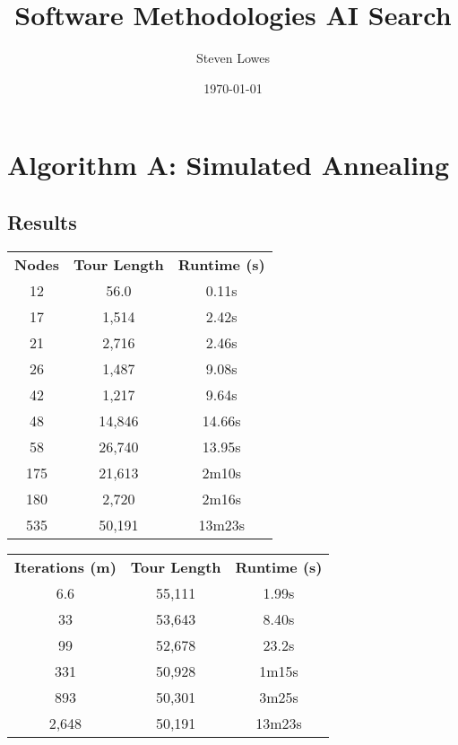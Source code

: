 \documentclass[a4paper, 11pt,table]{article}
\author{Steven Lowes}
\title{Software Methodologies AI Search}
\date{\today{}}
\begin{document}
	\section{Algorithm A: Simulated Annealing}
	
	\subsection{Results}
	\label{useCase:annealResults}
	\begin{center}
		\begin{tabu}{|c c c|}
			\textbf{Nodes} & \textbf{Tour Length} & \textbf{Runtime (s)}\\
			12 & 56.0 & 0.11s \\
			17 & 1,514 & 2.42s\\
			21 & 2,716 & 2.46s\\
			26 & 1,487 & 9.08s\\
			42 & 1,217 & 9.64s\\
			48 & 14,846 & 14.66s\\
			58 & 26,740 & 13.95s\\
			175 & 21,613 & 2m10s\\
			180 & 2,720 & 2m16s\\
			535 & 50,191 & 13m23s\\
		\end{tabu}
	\end{center}

	\begin{center}
		\begin{tabu}{|c c c|}
			\textbf{Iterations (m)} & \textbf{Tour Length} & \textbf{Runtime (s)}\\
			6.6 & 55,111 & 1.99s\\
			33 & 53,643 & 8.40s\\
			99 & 52,678 & 23.2s\\
			331 & 50,928 & 1m15s\\
			893 & 50,301 & 3m25s\\
			2,648 & 50,191 & 13m23s \\
		\end{tabu}
	\end{center}

	\begin{center}
	\end{center}
\end{document}
